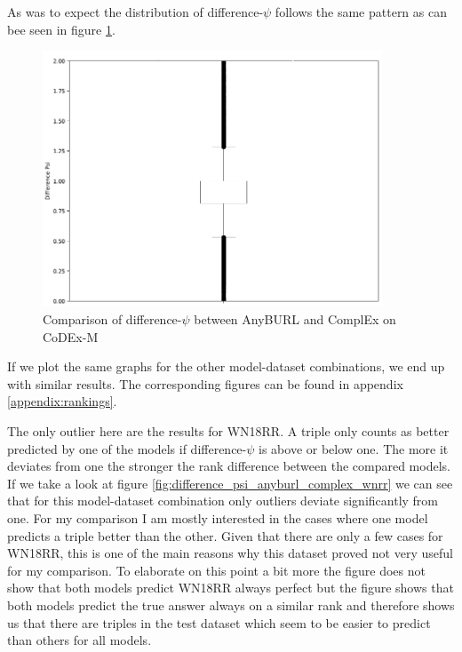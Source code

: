 As was to expect the distribution of difference-$\psi$ follows the same pattern as can bee seen in figure \ref{fig:difference_psi_anyburl_complex_codex}. 

\begin{figure}[H]
\centering
\includegraphics[width=0.9\textwidth]{images/difference_psi_anyburl_complex_codex.png}
\caption{Comparison of difference-$\psi$ between AnyBURL and ComplEx on CoDEx-M}
\label{fig:difference_psi_anyburl_complex_codex}
\end{figure}

If we plot the same graphs for the other model-dataset combinations, we end up with similar results. The corresponding figures can be found in appendix \ref{appendix:rankings}.

The only outlier here are the results for WN18RR. A triple only counts as better predicted by one of the models if difference-$\psi$ is above or below one. The more it deviates from one the stronger the rank difference between the compared models. If we take a look at figure \ref{fig:difference_psi_anyburl_complex_wnrr} we can see that for this model-dataset combination only outliers deviate significantly from one. For my comparison I am mostly interested in the cases where one model predicts a triple better than the other. Given that there are only a few cases for WN18RR, this is one of the main reasons why this dataset proved not very useful for my comparison. To elaborate on this point a bit more the figure does not show that both models predict WN18RR always perfect but the figure shows that both models predict the true answer always on a similar rank and therefore shows us that there are triples in the test dataset which seem to be easier to predict than others for all models. 

